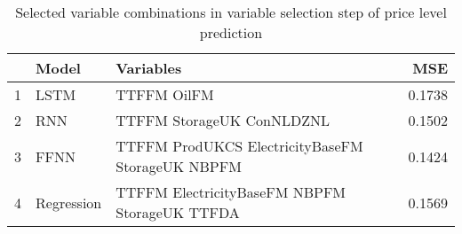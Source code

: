 \begin{table}[ht]
\centering
\begin{tabular}{rllr}
  \hline
 & Model & Variables & MSE \\ 
  \hline
1 & LSTM & TTFFM OilFM & 0.1738 \\ 
  2 & RNN & TTFFM StorageUK ConNLDZNL & 0.1502 \\ 
  3 & FFNN & TTFFM ProdUKCS ElectricityBaseFM StorageUK NBPFM & 0.1424 \\ 
  4 & Regression & TTFFM ElectricityBaseFM NBPFM StorageUK TTFDA & 0.1569 \\ 
   \hline
\end{tabular}
\caption{Selected variable combinations in variable selection step of price level prediction} 
\label{tab:level.var.selection.short}
\end{table}
